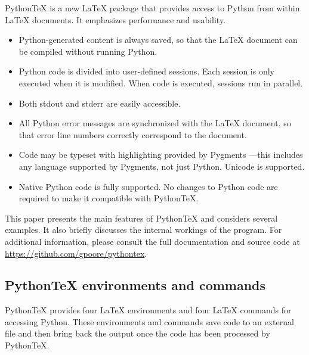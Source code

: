 \documentclass[letterpaper,compsoc,twoside]{IEEEtran}
\begin{document}
PythonTeX is a new LaTeX package that provides access to Python from
within LaTeX documents. It emphasizes performance and usability.%
\begin{itemize}

\item 

Python-generated content is always saved, so that the LaTeX document
can be compiled without running Python.
\item 

Python code is divided into user-defined sessions. Each session is
only executed when it is modified. When code is executed, sessions run
in parallel.
\item 

Both stdout and stderr are easily accessible.
\item 

All Python error messages are synchronized with the LaTeX document, so
that error line numbers correctly correspond to the document.
\item 

Code may be typeset with highlighting provided by Pygments \cite{Pyg}—this
includes any language supported by Pygments, not just Python.
Unicode is supported.
\item 

Native Python code is fully supported. No changes to Python code are
required to make it compatible with PythonTeX.
\end{itemize}


This paper presents the main features of PythonTeX and considers
several examples.  It also briefly discusses the internal workings of
the program. For additional information, please consult the full
documentation and source code at \url{https://github.com/gpoore/pythontex}.

\subsection{PythonTeX environments and commands%
  \label{pythontex-environments-and-commands}%
}


PythonTeX provides four LaTeX environments and four LaTeX commands for
accessing Python. These environments and commands save code to an
external file and then bring back the output once the code has been
processed by PythonTeX.
\end{document}
